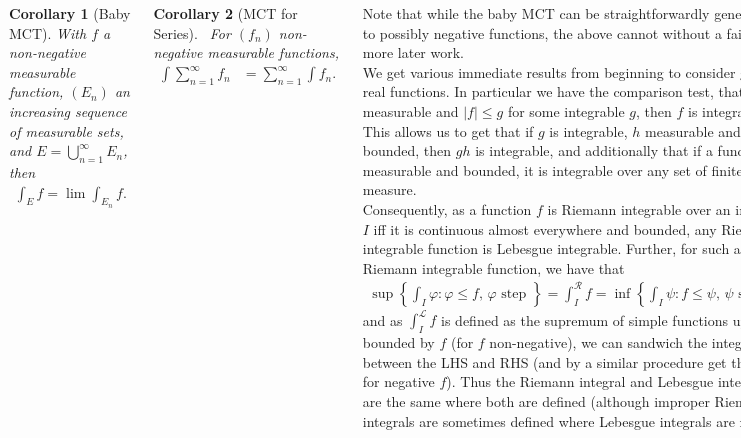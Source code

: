 \documentclass{tikzposter} %
\newtheorem{corollary}{Corollary}
\begin{document}
\begin{columns}
{    \begin{corollary}[Baby MCT]
      With $f$ a non-negative measurable function, $(E_{n})$ an increasing sequence of measurable sets, and $E = \bigcup_{n=1}^{\infty} E_{n}$, then
      \begin{align*}
        \int_{E} f = \lim \int_{E_{n}} f.
      \end{align*}
    \end{corollary}
    \hphantom{}

    \begin{corollary}[MCT for Series]
      \ For $(f_{n})$ non-negative measurable functions,
      \begin{align*}
        \int \sum_{n=1}^{\infty} f_{n} &= \sum_{n=1}^{\infty} \int f_{n}.
      \end{align*}
    \end{corollary}
    \hphantom{}

    Note that while the baby MCT can be straightforwardly generalised to possibly negative functions, the above cannot without a fair bit more later work. \\

    We get various immediate results from beginning to consider general real functions. In particular we have the comparison test, that if $f$ is measurable and $|f| \le g$ for some integrable $g$, then $f$ is integrable. This allows us to get that if $g$ is integrable, $h$ measurable and bounded, then $gh$ is integrable, and additionally that if a function is measurable and bounded, it is integrable over any set of finite measure. \\

    Consequently, as a function $f$ is Riemann integrable over an interval $I$ iff it is continuous almost everywhere and bounded, any Riemann integrable function is Lebesgue integrable. Further, for such a Riemann integrable function, we have that
    \begin{align*}
      \sup\left\{ \int_{I} \varphi : \varphi \le f,\,\varphi \text{ step }\right\} = \int_{I}^{\mathcal{R}} f = \inf \left \{\int_{I} \psi : f \le \psi,\,\psi \text{ step }\},
    \end{align*}
    and as $\int^{\mathcal{L}}_{I} f$ is defined as the supremum of simple functions upper bounded by $f$ (for $f$ non-negative), we can sandwich the integral between the LHS and RHS (and by a similar procedure get the same for negative $f$). Thus the Riemann integral and Lebesgue integral are the same where both are defined (although improper Riemann integrals are sometimes defined where Lebesgue integrals are not). \\

}
\end{columns}
\end{document}
